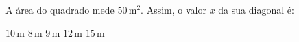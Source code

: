 A \'area do quadrado mede $50$\,m$^2$. Assim, o valor $x$ da sua diagonal \'e:

\parbox{0.35\linewidth}{

$10$\,m
$8$\,m
$9$\,m
$12$\,m
$15$\,m

}\parbox{0.64\linewidth}{
\begin{center}
\vspace{-6mm}
\vspace{-9mm}
\end{center}
}


